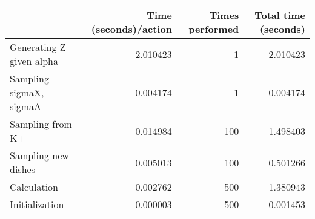 \begin{tabular}{lrrr}
\toprule
{} &  Time (seconds)/action &  Times performed &  Total time (seconds) \\
\midrule
Generating Z given alpha&                2.010423 &                          1 &           2.010423 \\
Sampling sigmaX, sigmaA &                0.004174 &                          1 &           0.004174 \\
Sampling from K+        &                0.014984 &                        100 &           1.498403 \\
Sampling new dishes     &                0.005013 &                        100 &           0.501266 \\
Calculation             &                0.002762 &                        500 &           1.380943 \\
Initialization          &                0.000003 &                        500 &           0.001453 \\
\bottomrule
\end{tabular}

